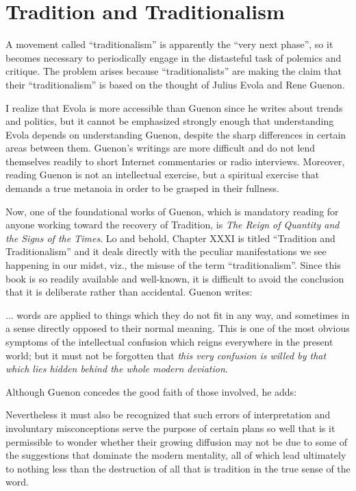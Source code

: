 \section{Tradition and Traditionalism}

A movement called ``traditionalism'' is apparently the ``very next phase'', so it becomes necessary to periodically engage in the distasteful task of polemics and critique. The problem arises because ``traditionalists'' are making the claim that their ``traditionalism'' is based on the thought of Julius Evola and Rene Guenon.

I realize that Evola is more accessible than Guenon since he writes about trends and politics, but it cannot be emphasized strongly enough that understanding Evola depends on understanding Guenon, despite the sharp differences in certain areas between them. Guenon's writings are more difficult and do not lend themselves readily to short Internet commentaries or radio interviews. Moreover, reading Guenon is not an intellectual exercise, but a spiritual exercise that demands a true metanoia in order to be grasped in their fullness.

Now, one of the foundational works of Guenon, which is mandatory reading for anyone working toward the recovery of Tradition, is \textit{The Reign of Quantity and the Signs of the Times}. Lo and behold, Chapter XXXI is titled ``Tradition and Traditionalism'' and it deals directly with the peculiar manifestations we see happening in our midst, viz., the misuse of the term ``traditionalism''. Since this book is so readily available and well-known, it is difficult to avoid the conclusion that it is deliberate rather than accidental. Guenon writes:

\begin{quotex}
... words are applied to things which they do not fit in any way, and sometimes in a sense directly opposed to their normal meaning. This is one of the most obvious symptoms of the intellectual confusion which reigns everywhere in the present world; but it must not be forgotten that \emph{this very confusion is willed by that which lies hidden behind the whole modern deviation}.
\end{quotex}


Although Guenon concedes the good faith of those involved, he adds:

\begin{quotex}
Nevertheless it must also be recognized that such errors of interpretation and involuntary misconceptions serve the purpose of certain plans so well that is it permissible to wonder whether their growing diffusion may not be due to some of the suggestions that dominate the modern mentality, all of which lead ultimately to nothing less than the destruction of all that is tradition in the true sense of the word.
\end{quotex}



